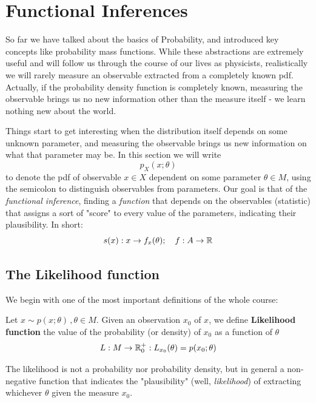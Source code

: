 \chapter{Functional Inferences}

So far we have talked about the basics of Probability, and introduced key concepts like probability mass functions. While these abstractions are extremely useful and will follow us through the course of our lives as physicists, realistically we will rarely measure an observable extracted from a completely known pdf. Actually, if the probability density function is completely known, measuring the observable brings us no new information other than the measure itself - we learn nothing new about the world. 

Things start to get interesting when the distribution itself depends on some unknown parameter, and measuring the observable brings us new information on what that parameter may be. In this section we will write
	\[
	p_X(x;\theta)
	\]
to denote the pdf of observable $x\in X$ dependent on some parameter $\theta\in M$, using the semicolon to distinguish observables from parameters. Our goal is that of the \emph{functional inference}, finding a \emph{function} that depends on the observables (statistic) that assigns a sort of "score" to every value of the parameters, indicating their plausibility. In short:
	\[
	s(x): x\rightarrow f_x(\theta); \quad f:A\rightarrow \mathbb{R}
	\]

\section{The Likelihood function}

We begin with one of the most important definitions of the whole course:

\begin{definition}
	Let $x\sim p(x;\theta)\, , \theta\in M$. Given an observation $x_0$ of $x$, we define \textbf{Likelihood function} the value of the probability (or density) of $x_0$ as a function of $\theta$
	\[
	L: M \rightarrow \mathbb{R}_0^+:L_{x_0}(\theta)=p(x_0;\theta)
	\]
\end{definition}

The likelihood is not a probability nor probability density, but in general a non-negative function that indicates the "plausibility" (well, \emph{likelihood}) of extracting whichever $\theta$ given the measure $x_0$.

